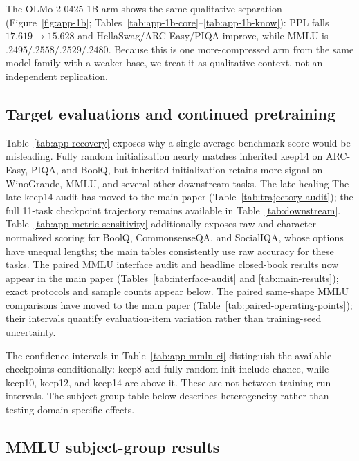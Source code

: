 The OLMo-2-0425-1B arm shows the same qualitative separation
(Figure~\ref{fig:app-1b}; Tables~\ref{tab:app-1b-core}--\ref{tab:app-1b-know}):
PPL falls $17.619\to15.628$ and HellaSwag/ARC-Easy/PIQA improve, while MMLU is
$.2495/.2558/.2529/.2480$. Because this is one more-compressed arm from the same
model family with a weaker base, we treat it as qualitative context, not an
independent replication.



\subsection{Target evaluations and continued pretraining}
\label{app:recovery}




Table~\ref{tab:app-recovery} exposes why a single average benchmark score would
be misleading. Fully random initialization nearly matches inherited keep14 on
ARC-Easy, PIQA, and BoolQ, but inherited initialization retains more signal on
WinoGrande, MMLU, and several other downstream tasks. The late-healing
The late keep14 audit has moved to the main paper
(Table~\ref{tab:trajectory-audit}); the full 11-task checkpoint trajectory
remains available in Table~\ref{tab:downstream}.
Table~\ref{tab:app-metric-sensitivity} additionally exposes raw and
character-normalized scoring for BoolQ, CommonsenseQA, and SocialIQA,
whose options have unequal lengths; the main tables consistently use raw
accuracy for these tasks. The paired MMLU interface audit and headline
closed-book results now appear in the main paper
(Tables~\ref{tab:interface-audit} and \ref{tab:main-results}); exact protocols
and sample counts appear below.
The paired same-shape MMLU comparisons have moved to the main paper
(Table~\ref{tab:paired-operating-points}); their intervals quantify
evaluation-item variation rather than training-seed uncertainty.

The confidence intervals in Table~\ref{tab:app-mmlu-ci} distinguish the
available checkpoints conditionally: keep8 and fully random init include
chance, while keep10, keep12, and keep14 are above it. These are not
between-training-run intervals. The subject-group table below describes
heterogeneity rather than testing domain-specific effects.

\subsection{MMLU subject-group results}
\label{app:mmlu-subjects}

